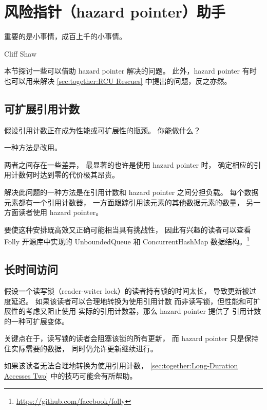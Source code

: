 
\section{风险指针（hazard pointer）助手}
\label{sec:together:Hazard-Pointer Helpers}
%
\epigraph{重要的是小事情，成百上千的小事情。}
	 {Cliff Shaw}

本节探讨一些可以借助 hazard pointer 解决的问题。
此外，hazard pointer 有时也可以用来解决
\cref{sec:together:RCU Rescues} 中提出的问题，反之亦然。

\subsection{可扩展引用计数}
\label{sec:together:Scalable Reference Count}

假设引用计数正在成为性能或可扩展性的瓶颈。
你能做什么？

一种方法是改用。

两者之间存在一些差异，
最显著的也许是使用 hazard pointer 时，
确定相应的引用计数何时达到零的代价极其昂贵。

解决此问题的一种方法是在引用计数和 hazard pointer 之间分担负载。
每个数据元素都有一个引用计数器，
一方面跟踪引用该元素的其他数据元素的数量，
另一方面读者使用 hazard pointer。

要使这种安排既高效又正确可能相当具有挑战性，
因此有兴趣的读者可以查看
Folly 开源库中实现的 UnboundedQueue 和 ConcurrentHashMap 数据结构。\footnote{
	\url{https://github.com/facebook/folly}}

\subsection{长时间访问}
\label{sec:together:Long-Duration Accesses}

假设一个读写锁（reader-writer lock）的读者持有锁的时间太长，
导致更新被过度延迟。
如果该读者可以合理地转换为使用引用计数
而非读写锁，但性能和可扩展性的考虑又阻止使用
实际的引用计数器，那么 hazard pointer 提供了
引用计数的一种可扩展变体。

关键点在于，读写锁的读者会阻塞该锁的所有更新，
而 hazard pointer 只是保持住实际需要的数据，
同时仍允许更新继续进行。

如果该读者无法合理地转换为使用引用计数，
\cref{sec:together:Long-Duration Accesses Two}
中的技巧可能会有所帮助。




